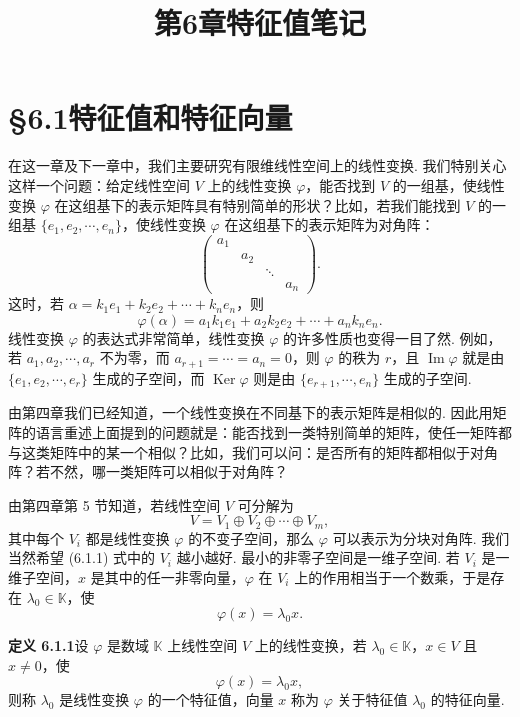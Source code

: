\documentclass[UTF8,12pt,a4paper,fontset=fandol]{ctexart}
\title{第6章\quad 特征值笔记}
\author{}
\date{}
\begin{document}
\maketitle

\section*{§6.1\quad 特征值和特征向量}

在这一章及下一章中，我们主要研究有限维线性空间上的线性变换. 我们特别关心这样一个问题：给定线性空间 $V$ 上的线性变换 $\varphi$，能否找到 $V$ 的一组基，使线性变换 $\varphi$ 在这组基下的表示矩阵具有特别简单的形状？比如，若我们能找到 $V$ 的一组基 $\{e_1,e_2,\cdots,e_n\}$，使线性变换 $\varphi$ 在这组基下的表示矩阵为对角阵：
\[
\left(\begin{array}{cccc}
a_1 & & & \\
& a_2 & & \\
& & \ddots & \\
& & & a_n
\end{array}\right).
\]
这时，若 $\alpha=k_1e_1+k_2e_2+\cdots+k_ne_n$，则
\[
\varphi(\alpha)=a_1k_1e_1+a_2k_2e_2+\cdots+a_nk_ne_n.
\]
线性变换 $\varphi$ 的表达式非常简单，线性变换 $\varphi$ 的许多性质也变得一目了然. 例如，若 $a_1,a_2,\cdots,a_r$ 不为零，而 $a_{r+1}=\cdots=a_n=0$，则 $\varphi$ 的秩为 $r$，且 $\operatorname{Im}\varphi$ 就是由 $\{e_1,e_2,\cdots,e_r\}$ 生成的子空间，而 $\operatorname{Ker}\varphi$ 则是由 $\{e_{r+1},\cdots,e_n\}$ 生成的子空间.

由第四章我们已经知道，一个线性变换在不同基下的表示矩阵是相似的. 因此用矩阵的语言重述上面提到的问题就是：能否找到一类特别简单的矩阵，使任一矩阵都与这类矩阵中的某一个相似？比如，我们可以问：是否所有的矩阵都相似于对角阵？若不然，哪一类矩阵可以相似于对角阵？

由第四章第 5 节知道，若线性空间 $V$ 可分解为
\begin{equation}
V=V_1\oplus V_2\oplus\cdots\oplus V_m,
\tag{6.1.1}
\end{equation}
其中每个 $V_i$ 都是线性变换 $\varphi$ 的不变子空间，那么 $\varphi$ 可以表示为分块对角阵. 我们当然希望 (6.1.1) 式中的 $V_i$ 越小越好. 最小的非零子空间是一维子空间. 若 $V_i$ 是一维子空间，$x$ 是其中的任一非零向量，$\varphi$ 在 $V_i$ 上的作用相当于一个数乘，于是存在 $\lambda_0\in\mathbb{K}$，使
\[
\varphi(x)=\lambda_0x.
\]

\noindent\textbf{定义 6.1.1}\quad 设 $\varphi$ 是数域 $\mathbb{K}$ 上线性空间 $V$ 上的线性变换，若 $\lambda_0\in\mathbb{K}$，$x\in V$ 且 $x\neq 0$，使
\begin{equation}
\varphi(x)=\lambda_0x,
\tag{6.1.2}
\end{equation}
则称 $\lambda_0$ 是线性变换 $\varphi$ 的一个特征值，向量 $x$ 称为 $\varphi$ 关于特征值 $\lambda_0$ 的特征向量.
\end{document}
